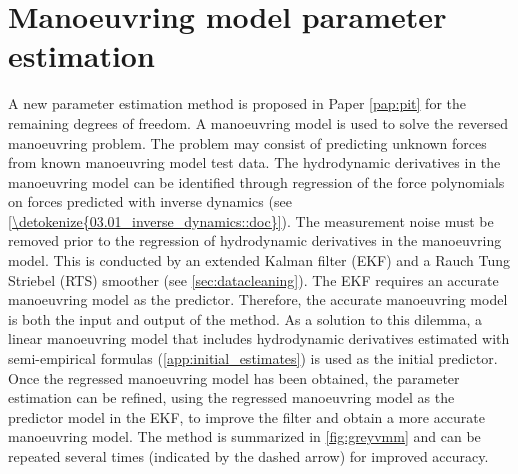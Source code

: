 \section{Manoeuvring model parameter estimation} \label{sec:_VMM}
A new parameter estimation method is proposed in Paper \ref{pap:pit} for the remaining degrees of freedom. A manoeuvring model is used to solve the reversed manoeuvring problem. The problem may consist of predicting unknown forces from known manoeuvring model test data. The hydrodynamic derivatives in the manoeuvring model can be identified through regression of the force polynomials on forces predicted with inverse dynamics (see \autoref{\detokenize{03.01_inverse_dynamics::doc}}).
The measurement noise must be removed prior to the regression of hydrodynamic derivatives in the manoeuvring model. This is conducted by an extended Kalman filter (EKF) and a Rauch Tung Striebel (RTS) smoother (see \autoref{sec:datacleaning}). The EKF requires an accurate manoeuvring model as the predictor.
Therefore, the accurate manoeuvring model is both the input and output of the method. As a solution to this dilemma, a linear manoeuvring model that includes hydrodynamic derivatives estimated with semi-empirical formulas (\autoref{app:initial_estimates}) is used as the initial predictor. Once the regressed manoeuvring model has been obtained, the parameter estimation can be refined, using the regressed manoeuvring model as the predictor model in the EKF, to improve the filter and obtain a more accurate manoeuvring model. The method is summarized in \autoref{fig:greyvmm} and can be repeated several times (indicated by the dashed arrow) for improved accuracy. 
